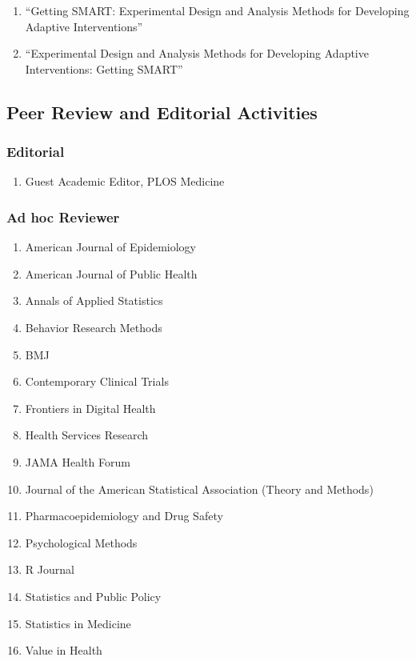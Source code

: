 \documentclass[letterpaper,11pt]{article} %
\begin{document}
\begin{enumerate}
		\item ``Getting SMART: Experimental Design and Analysis Methods for Developing Adaptive Interventions''
        
		\item ``Experimental Design and Analysis Methods for Developing Adaptive Interventions: Getting SMART''
	\end{enumerate}

	\subsection*{Peer Review and Editorial Activities}
    \subsubsection*{Editorial}
    \begin{enumerate}
        \item Guest Academic Editor, PLOS Medicine
    \end{enumerate}
        
    \subsubsection*{Ad hoc Reviewer}
	\begin{enumerate}[noitemsep,leftmargin = 1.25em]
		\item[] American Journal of Epidemiology
		\item[] American Journal of Public Health
		\item[] Annals of Applied Statistics
		\item[] Behavior Research Methods
        \item[] BMJ
        \item[] Contemporary Clinical Trials
		\item[] Frontiers in Digital Health
        \item[] Health Services Research
        \item[] JAMA Health Forum
		\item[] Journal of the American Statistical Association (Theory and Methods)
		\item[] Pharmacoepidemiology and Drug Safety
		\item[] Psychological Methods
		\item[] R Journal
		\item[] Statistics and Public Policy
		\item[] Statistics in Medicine
		\item[] Value in Health
	\end{enumerate}
	
\end{document}
